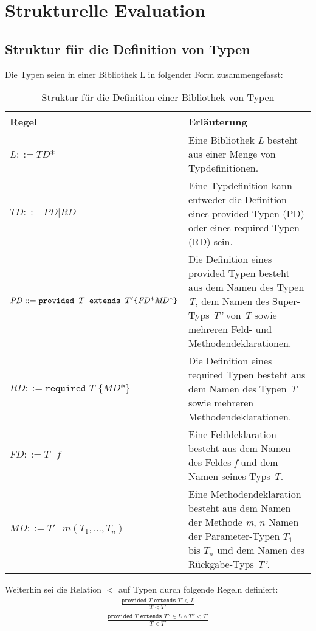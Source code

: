 \section{Strukturelle Evaluation}
\subsection{Struktur für die Definition von Typen}\label{sec:strukturTypen}
Die Typen seien in einer Bibliothek $\text{L}$ in folgender Form zusammengefasst:
\begin{table}[H]
\centering
\begin{tabular}{|p{5.5cm}|p{8.5cm}|}
\hline
\hline
\centering\textbf{Regel} & \textbf{Erläuterung} \\
\hline
\hline
$\mathit{L} ::= \mathit{TD}\text{*}$ & Eine Bibliothek \emph{L} besteht aus einer Menge von Typdefinitionen.\\
\hline
$\mathit{TD} ::= \mathit{PD} | \mathit{RD}$ & Eine Typdefinition kann entweder die Definition eines provided Typen (PD) oder eines required Typen (RD) sein.\\
\hline
$\mathit{PD} ::= \newline\texttt{provided }T \texttt{ extends } T' \newline  \texttt{\{} \mathit{FD}\text{*} \mathit{MD}\text{*}\texttt{\}}$& Die Definition eines provided Typen besteht aus dem Namen des Typen \emph{T}, dem Namen des Super-Typs \emph{T'} von \emph{T} sowie mehreren Feld- und Methodendeklarationen.\\
\hline
$\mathit{RD} ::= \texttt{required } T \texttt{ \{}\mathit{MD}\text{*}\texttt{\}}$ & Die Definition eines required Typen besteht aus dem Namen des Typen \emph{T} sowie mehreren Methodendeklarationen.\\
\hline
$\mathit{FD} ::= T \texttt{ }\mathit{f}$ & Eine Felddeklaration besteht aus dem Namen des Feldes \emph{f} und dem Namen seines Typs \emph{T}.\\
\hline
$\mathit{MD} ::= \mathit{T'}\texttt{ }\mathit{m(T_1,...,T_n)}$ & Eine Methodendeklaration besteht aus dem Namen der Methode \emph{m}, $n$ Namen der Parameter-Typen $T_1$ bis $T_n$ und dem Namen des Rückgabe-Typs \emph{T'}.\\
\hline
\hline
\end{tabular}
\caption{Struktur für die Definition einer Bibliothek von Typen}
 \label{tab:eIShort}
\end{table}
\noindent
Weiterhin sei die Relation $<$ auf Typen durch folgende Regeln definiert:
\begin{gather*}
\frac{\texttt{provided }T \texttt{ extends } T' \in L}{T < T'}
\end{gather*}
\begin{gather*}
\frac{\texttt{provided } T \texttt{ extends } T'' \in L \wedge T'' < T'}{T < T'}
\end{gather*}

